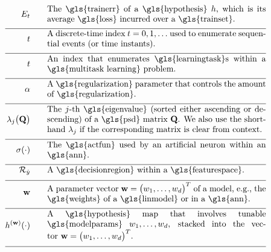 \begin{align}
	\trainerror \quad\quad &\parbox{.75\textwidth}{The \gls{trainerr} of a \gls{hypothesis} $\hypothesis$, which is its 
		average \gls{loss} incurred over a \gls{trainset}. }\nonumber \\[2mm] \hline \nonumber\\[-5mm]
	\timeidx \quad\quad &\parbox{.75\textwidth}{A discrete-time index $\timeidx=0,1,\ldots$ used to 
		enumerate sequential events (or time instants). }\nonumber \\[2mm] \hline \nonumber\\[-5mm]
	\taskidx \quad\quad &\parbox{.75\textwidth}{An index that enumerates
		\gls{learningtask}s within a \gls{multitask learning} problem.}\nonumber \\[2mm] \hline \nonumber\\[-5mm]
	\regparam \quad\quad &\parbox{.75\textwidth}{A \gls{regularization} parameter that controls 
		the amount of \gls{regularization}. } \nonumber \\[2mm] \hline \nonumber\\[-5mm]
	\eigval{\featureidx}\big( \mathbf{Q} \big) \quad\quad &\parbox{.75\textwidth}{The $\featureidx$-th 
		\gls{eigenvalue} (sorted either ascending or descending) of a \gls{psd} matrix $\mathbf{Q}$. We also 
		use the shorthand $\eigval{\featureidx}$ if the corresponding matrix is clear from context. }\nonumber \\[2mm] \hline \nonumber\\[-5mm]
	\actfun(\cdot) \quad\quad &\parbox{.75\textwidth}{The \gls{actfun} used by an artificial neuron within an \gls{ann}.}\nonumber \\[2mm] \hline \nonumber\\[-5mm]
	\decreg{\hat{\truelabel}} \quad\quad &\parbox{.75\textwidth}{A \gls{decisionregion} within a \gls{featurespace}.  }\nonumber \\[2mm] \hline \nonumber\\[-5mm]  
	\weights  \quad\quad & \parbox{.75\textwidth}{A parameter vector $\weights = \big(\weight_{1},\ldots,\weight_{\featuredim}\big)^{T}$ 
		of a model, e.g., the \gls{weights} of a \gls{linmodel} or in a \gls{ann}.}     \nonumber \\[2mm] \hline \nonumber\\[-5mm]
	\hypothesis^{(\weights)}(\cdot)  \quad\quad &\parbox{.75\textwidth}{A \gls{hypothesis} map that involves tunable \gls{modelparams} $\weight_{1},\ldots,\weight_{\featuredim}$, stacked into the vector $\weights=\big(\weight_{1},\ldots,\weight_{\featuredim} \big)^{T}$.} \nonumber \\[2mm] \hline \nonumber\\[-5mm]

\end{align}

